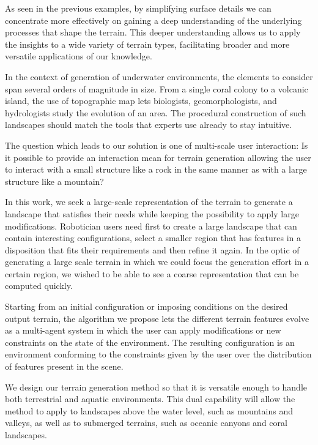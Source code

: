 As seen in the previous examples, by simplifying surface details we can concentrate more effectively on gaining a deep understanding of the underlying processes that shape the terrain. This deeper understanding allows us to apply the insights to a wide variety of terrain types, facilitating broader and more versatile applications of our knowledge. 

In the context of generation of underwater environments, the elements to consider span several orders of magnitude in size. From a single coral colony to a volcanic island, the use of topographic map lets biologists, geomorphologists, and hydrologists study the evolution of an area. The procedural construction of such landscapes should match the tools that experts use already to stay intuitive. 

The question which leads to our solution is one of multi-scale user interaction: Is it possible to provide an interaction mean for terrain generation allowing the user to interact with a small structure like a rock in the same manner as with a large structure like a mountain?

In this work, we seek a large-scale representation of the terrain to generate a landscape that satisfies their needs while keeping the possibility to apply large modifications. Robotician users need first to create a large landscape that can contain interesting configurations, select a smaller region that has features in a disposition that fits their requirements and then refine it again. In the optic of generating a large scale terrain in which we could focus the generation effort in a certain region, we wished to be able to see a coarse representation that can be computed quickly.

Starting from an initial configuration or imposing conditions on the desired output terrain, the algorithm we propose lets the different terrain features evolve as a multi-agent system in which the user can apply modifications or new constraints on the state of the environment. The resulting configuration is an environment conforming to the constraints given by the user over the distribution of features present in the scene. 

We design our terrain generation method so that it is versatile enough to handle both terrestrial and aquatic environments. This dual capability will allow the method to apply to landscapes above the water level, such as mountains and valleys, as well as to submerged terrains, such as oceanic canyons and coral landscapes. 

